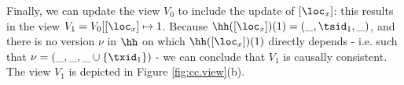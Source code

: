Finally, we can update the view $V_0$ to include the update of $[\loc_x]$: 
this results in the view $V_1 = V_0[ [\loc_x] \mapsto 1$. Because $\hh([\loc_x])(1) 
= (\_, \tsid_1, \_)$, and there is no version $\nu$ in $\hh$ on which 
$\hh([\loc_x])(1)$ directly depends - i.e. such that  
$\nu = (\_, \_, \_ \cup \{\txid_1\})$ - we can conclude that $V_1$ is causally 
consistent. The view $V_1$ is depicted in Figure \ref{fig:cc.view}(b).

%
%
%
%
%
%
%
%
%
